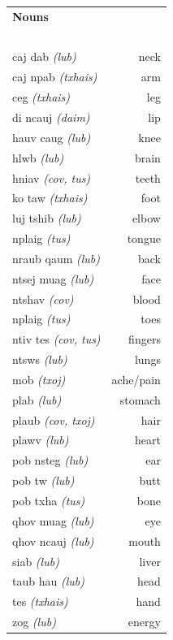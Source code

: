 \documentclass{article}
\begin{document}
\clearpage

\begin{multicols}{2}
[
\section*{}
]

\begin{tabular}{l r}
\textbf{Nouns} \\
~\\
caj dab {\em (lub)} &neck\\
caj npab {\em (txhais)} &arm\\
ceg {\em (txhais)} &leg\\
di ncauj {\em (daim)} &lip\\
hauv caug {\em (lub)} &knee\\
hlwb {\em (lub)} &brain\\
hniav {\em (cov, tus)} &teeth\\
ko taw {\em (txhais)} &foot\\
luj tshib {\em (lub)} &elbow\\
nplaig {\em (tus)} &tongue\\
nraub qaum {\em (lub)} &back\\
ntsej muag {\em (lub)} &face\\
ntshav {\em (cov)} &blood\\
nplaig {\em (tus)} &toes\\
ntiv tes {\em (cov, tus)} &fingers\\
ntsws {\em (lub)} &lungs\\
mob {\em (txoj)} &ache/pain\\
plab {\em (lub)} &stomach\\
plaub {\em (cov, txoj)} &hair\\
plawv {\em (lub)} &heart\\
pob nsteg {\em (lub)} &ear\\
pob tw {\em (lub)} &butt\\
pob txha {\em (tus)} &bone\\
qhov muag {\em (lub)} &eye\\
qhov ncauj {\em (lub)} &mouth\\
siab {\em (lub)} &liver\\
taub hau {\em (lub)} &head\\
tes {\em (txhais)} &hand\\
zog {\em (lub)} &energy\\

\end{tabular}


\end{multicols}
\end{document}
